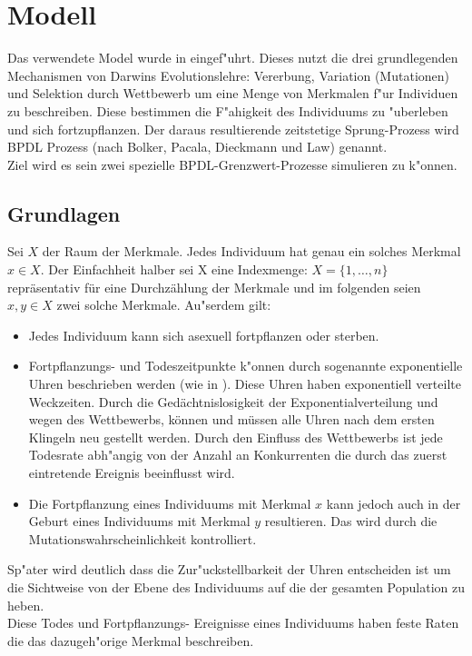 \documentclass[11pt, a4paper, german]{article}
\begin{document}

\clearpage
\section{Modell}
Das verwendete Model wurde in \cite{Bolker_Spatial_moment,Bolker1997179,raey} eingef"uhrt. Dieses nutzt die drei grundlegenden Mechanismen von Darwins Evolutionslehre: Vererbung, Variation (Mutationen) und Selektion durch Wettbewerb um eine Menge von Merkmalen f"ur Individuen zu beschreiben. Diese bestimmen die F"ahigkeit des Individuums zu "uberleben und sich fortzupflanzen. Der daraus resultierende zeitstetige Sprung-Prozess wird BPDL Prozess (nach Bolker, Pacala, Dieckmann und Law) genannt.\\
Ziel wird es sein zwei spezielle BPDL-Grenzwert-Prozesse simulieren zu k"onnen.
	\subsection{Grundlagen}
	Sei $ X $ der Raum der Merkmale. Jedes Individuum hat genau ein solches Merkmal $ x \in X $. Der Einfachheit halber sei X eine Indexmenge: $ X = \{1,\dots, n\} $ repräsentativ für eine Durchzählung der Merkmale und im folgenden seien $ x,y \in X $ zwei solche Merkmale. Au"serdem gilt:
	\begin{itemize}
		\item Jedes Individuum kann sich asexuell fortpflanzen oder sterben.
		\item Fortpflanzungs- und Todeszeitpunkte k"onnen durch sogenannte exponentielle Uhren beschrieben werden (wie in \cite[S. 3]{fournier2004microscopic}). Diese Uhren haben exponentiell verteilte Weckzeiten. Durch die Gedächtnislosigkeit der Exponentialverteilung und wegen des Wettbewerbs, können und müssen alle Uhren nach dem ersten Klingeln neu gestellt werden. Durch den Einfluss des Wettbewerbs ist jede Todesrate abh"angig von der Anzahl an Konkurrenten die durch das zuerst eintretende Ereignis beeinflusst wird. 
		\item Die Fortpflanzung eines Individuums mit Merkmal $ x $ kann jedoch auch in der Geburt eines Individuums mit Merkmal $ y $ resultieren. Das wird durch die Mutationswahrscheinlichkeit kontrolliert.
	\end{itemize}
	Sp"ater wird deutlich dass die Zur"uckstellbarkeit der Uhren entscheiden ist um die Sichtweise von der Ebene des Individuums auf die der gesamten Population zu heben.\\
	Diese Todes und Fortpflanzungs- Ereignisse eines Individuums haben feste Raten die das dazugeh"orige Merkmal beschreiben.\\
	
\end{document}

